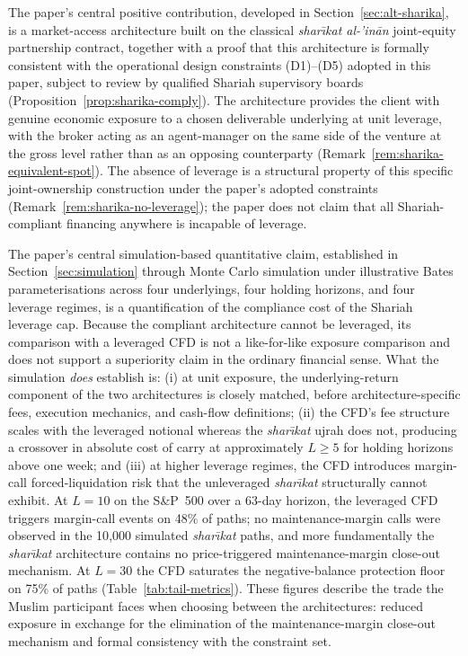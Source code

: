 \documentclass[preprint,12pt,authoryear]{elsarticle}
\theoremstyle{definition}
\begin{document}
The paper's central positive contribution, developed in
Section~\ref{sec:alt-sharika}, is a market-access architecture
built on the classical \emph{shar\={\i}kat al-'in\={a}n}
joint-equity partnership contract, together with a proof that
this architecture is formally consistent with the operational
design constraints (D1)--(D5) adopted in this paper, subject to
review by qualified Shariah supervisory boards
(Proposition~\ref{prop:sharika-comply}). The architecture
provides the client with genuine economic exposure to a chosen
deliverable underlying at unit leverage, with the broker acting
as an agent-manager on the same side of the venture at the
gross level rather than as an opposing counterparty
(Remark~\ref{rem:sharika-equivalent-spot}). The absence of
leverage is a structural property of this specific
joint-ownership construction under the paper's adopted
constraints (Remark~\ref{rem:sharika-no-leverage}); the paper
does not claim that all Shariah-compliant financing anywhere is
incapable of leverage.

The paper's central simulation-based quantitative claim,
established in Section~\ref{sec:simulation} through Monte Carlo
simulation under illustrative Bates parameterisations across
four underlyings,
four holding horizons, and four leverage regimes, is a
quantification of the compliance cost of the Shariah leverage
cap. Because the compliant architecture cannot be leveraged, its
comparison with a leveraged CFD is not a like-for-like exposure
comparison and does not support a superiority claim in the
ordinary financial sense. What the simulation \emph{does}
establish is: (i) at unit exposure, the underlying-return
component of the two architectures is closely matched, before
architecture-specific fees, execution mechanics, and cash-flow
definitions;
(ii) the CFD's fee structure scales with the leveraged notional
whereas the \emph{shar\={\i}kat} ujrah does not, producing a
crossover in absolute cost of carry at approximately $L \geq 5$
for holding horizons above one week; and (iii) at higher
leverage regimes, the CFD introduces margin-call forced-liquidation
risk that the unleveraged \emph{shar\={\i}kat} structurally
cannot exhibit. At $L = 10$ on the S\&P~500 over a 63-day
horizon, the leveraged CFD triggers margin-call events on 48\%
of paths; no maintenance-margin calls were observed in the
10{,}000 simulated \emph{shar\={\i}kat} paths, and more
fundamentally the \emph{shar\={\i}kat} architecture contains no
price-triggered maintenance-margin close-out mechanism. At
$L = 30$ the CFD saturates the
negative-balance protection floor on 75\% of paths
(Table~\ref{tab:tail-metrics}). These figures describe the
trade the Muslim participant faces when choosing between the
architectures: reduced exposure in exchange for the elimination
of the maintenance-margin close-out mechanism and formal
consistency with the constraint set.
\end{document}
